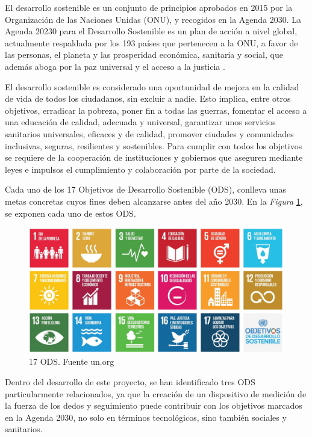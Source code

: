 
El desarrollo sostenible es un conjunto de principios aprobados en 2015 por la Organización de las Naciones Unidas (ONU), y recogidos en la Agenda 2030. La Agenda 20230 para el Desarrollo Sostenible es un plan de acción a nivel global, actualmente respaldada por los 193 países que pertenecen a la ONU, a favor de las personas, el planeta y las prosperidad económica, sanitaria y social, que además aboga por la paz universal y el acceso a la justicia \cite{Agenda2030_gobierno}.

El desarrollo sostenible es considerado una oportunidad de mejora en la calidad de vida de todos los ciudadanos, sin excluir a nadie. Esto implica, entre otros objetivos, erradicar la pobreza, poner fin a todas las guerras, fomentar el acceso a una educación de calidad, adecuada y universal, garantizar unos servicios sanitarios universales, eficaces y de calidad, promover ciudades y comunidades inclusivas, seguras, resilientes y sostenibles. Para cumplir con todos los objetivos se requiere de la cooperación de instituciones y gobiernos que aseguren mediante leyes e impulsos el cumplimiento y colaboración por parte de la sociedad. \cite{ODS}

Cada uno de los 17 Objetivos de Desarrollo Sostenible (ODS), conlleva unas metas concretas cuyos fines deben alcanzarse antes del año 2030. En la \textit{Figura} \ref{fig:ODS}, se exponen cada uno de estos ODS.

\begin{figure}
    \centering
    \includegraphics[width=1\linewidth]{img/ODS.png}
    \caption{17 ODS. Fuente un.org}
    \label{fig:ODS}
\end{figure}

Dentro del desarrollo de este proyecto, se han identificado tres ODS particularmente relacionados, ya que la creación de un dispositivo de medición de la fuerza de los dedos y seguimiento puede contribuir con los objetivos marcados en la Agenda 2030, no solo en términos tecnológicos, sino también sociales y sanitarios.

